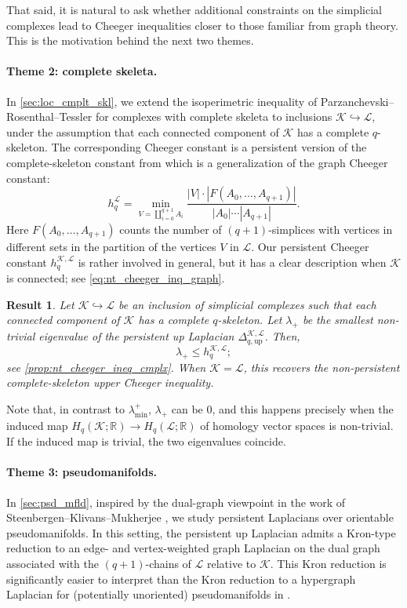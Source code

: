 \documentclass{article}
\newtheorem{resultx}{Result}
\newcommand{\R}{\mathbb{R}}
\newcommand{\KK}{\mathcal{K}}
\newcommand{\LL}{\mathcal{L}}
\begin{document}
That said, it is natural to ask whether additional constraints on the simplicial complexes lead to Cheeger inequalities closer to those familiar from graph theory. This is the motivation behind the next two themes.

\paragraph{Theme 2: complete skeleta.} In \cref{sec:loc_cmplt_skl}, we extend the isoperimetric inequality of Parzanchevski--Rosenthal--Tessler \cite{MR3516884} for complexes with complete skeleta to inclusions \(\KK\hookrightarrow\LL\), under the assumption that each connected component of \(\KK\) has a complete \(q\)-skeleton. The corresponding Cheeger constant is a persistent version of the complete-skeleton constant from \cite{MR3516884} which is a generalization of the graph Cheeger constant:
\[
h_q^{\LL}
=
\min_{V=\coprod_{i=0}^{q+1}A_i}
\frac{|V|\cdot |F(A_0,\ldots,A_{q+1})|}
{|A_0|\cdots |A_{q+1}|}.
\]
Here $F(A_0, \ldots, A_{q+1})$ counts the number of $(q+1)$-simplices with vertices in different sets in the partition of the vertices $V$ in $\LL$. Our persistent Cheeger constant $h_q^{\KK,\LL}$ is rather involved in general, but it has a clear description when $\KK$ is connected; see \cref{eq:nt_cheeger_inq_graph}.

\begin{resultx}
\label{res:locally_complete_skeletons}
Let \(\KK\hookrightarrow \LL\) be an inclusion of simplicial complexes such that each connected component of \(\KK\) has a complete \(q\)-skeleton. Let
$\lambda_{+}$
be the smallest \emph{non-trivial} eigenvalue of the persistent up Laplacian $\Delta_{q,\mathrm{up}}^{\KK,\LL}$. Then,
\[
\lambda_{+}\leq h_q^{\KK,\LL};
\]
see \cref{prop:nt_cheeger_ineq_cmplx}. When \(\KK=\LL\), this recovers the non-persistent complete-skeleton upper Cheeger inequality.
\end{resultx}
Note that, in contrast to $\lambda_{\min}^+$, $\lambda_{+}$ can be $0$, and this happens precisely when the induced map $H_q(\KK;\R)\to H_q(\LL;\R)$ of homology vector spaces is non-trivial. If the induced map is trivial, the two eigenvalues coincide. 

\paragraph{Theme 3: pseudomanifolds.} In \cref{sec:psd_mfld}, inspired by the dual-graph viewpoint in the work of Steenbergen--Klivans--Mukherjee \cite{MR3194207}, we study persistent Laplacians over orientable pseudomanifolds. In this setting, the persistent up Laplacian admits a Kron-type reduction to an edge- and vertex-weighted graph Laplacian on the dual graph associated with the \((q+1)\)-chains of \(\LL\) relative to \(\KK\). This Kron reduction is significantly easier to interpret than the Kron reduction to a hypergraph Laplacian for (potentially unoriented) pseudomanifolds in \cite{MR5053447}.
\end{document}
